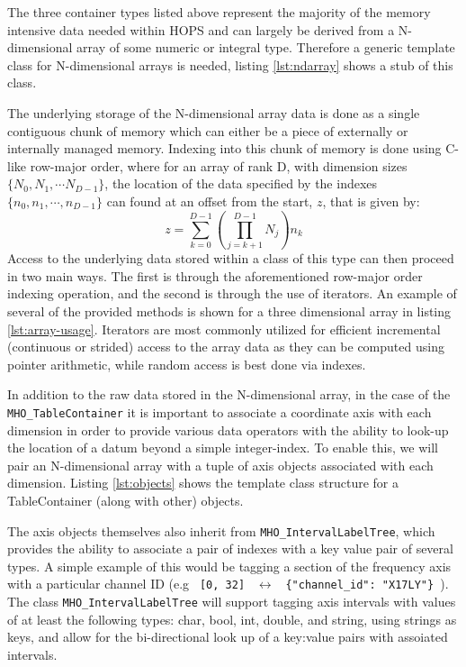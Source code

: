 The three container types listed above represent the majority of the memory intensive data needed within HOPS
and can largely be derived from a N-dimensional array of some numeric or integral type. Therefore a generic template class for
N-dimensional arrays is needed, listing \ref{lst:ndarray} shows a stub of this class.

The underlying storage of the N-dimensional array data is done as a single contiguous chunk of memory which can either be a piece of externally or internally managed memory. Indexing into this chunk of memory is done using C-like row-major order, where for an array of rank D, with dimension sizes $\{N_0, N_1, \cdots N_{D-1}\}$, the location of the data specified by the indexes $\{n_0, n_1, \cdots, n_{D-1}\}$ can found at an offset from the start, $z$, that is given by:
\begin{equation}
 z = \sum_{k=0}^{D-1} \left ( \prod_{j=k+1}^{D-1} N_j \right) n_k
 \end{equation}
Access to the underlying data stored within a class of this type can then proceed in two main ways. The first is through the aforementioned
row-major order indexing operation, and the second is through the use of iterators. An example of several of the provided methods is shown for a three dimensional array in listing \ref{lst:array-usage}. Iterators are most commonly utilized for efficient incremental (continuous or strided) access to the array data as they can be computed using pointer arithmetic, while random access is best done via indexes.


In addition to the raw data stored in the N-dimensional array, in the case of the \texttt{MHO\_TableContainer} it is important to associate a coordinate axis with each dimension in order to provide various data operators with the ability to look-up the location of a datum beyond a simple integer-index. To enable this,
we will pair an N-dimensional array with a tuple of axis objects associated with each dimension. Listing \ref{lst:objects} shows the template class structure
for a TableContainer (along with other) objects.

The axis objects themselves also inherit from \texttt{MHO\_IntervalLabelTree}, which provides the ability to associate a pair of indexes with a key value pair of several types. A simple example of this would be tagging a section of the frequency axis with a particular channel ID (e.g \texttt{ [0, 32] } $\leftrightarrow$ \texttt{ \{"channel\_id": "X17LY"\} }). The class \texttt{MHO\_IntervalLabelTree} will support tagging axis intervals with values of at least the following types: char, bool, int, double, and string, using strings as keys, and allow for the bi-directional look up of a key:value pairs with assoiated intervals.

